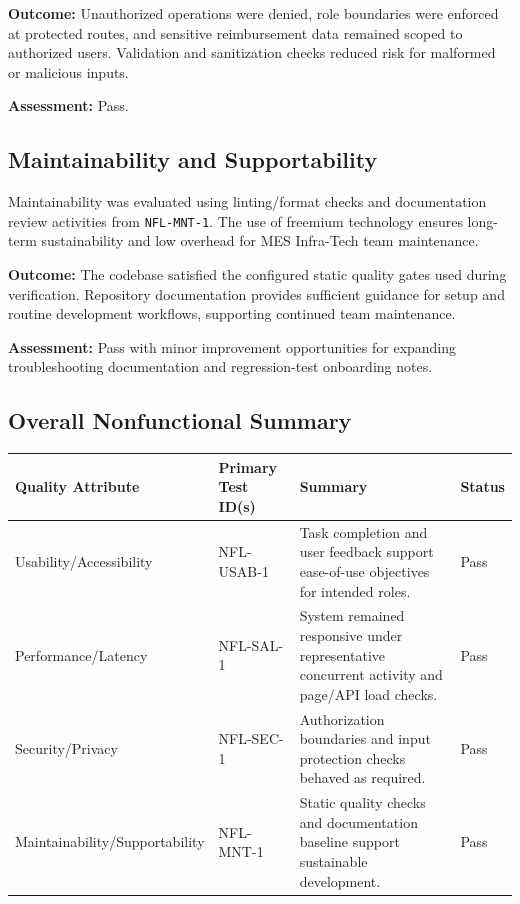 \documentclass[12pt, titlepage]{article}
\begin{document}
\textbf{Outcome:}
Unauthorized operations were denied, role boundaries were enforced at protected
routes, and sensitive reimbursement data remained scoped to authorized users.
Validation and sanitization checks reduced risk for malformed or malicious
inputs.

\textbf{Assessment:} Pass.

\subsection{Maintainability and Supportability}

Maintainability was evaluated using linting/format checks and documentation
review activities from \texttt{NFL-MNT-1}. The use of freemium technology ensures
long-term sustainability and low overhead for MES Infra-Tech team maintenance.

\textbf{Outcome:}
The codebase satisfied the configured static quality gates used during
verification. Repository documentation provides sufficient guidance for setup and
routine development workflows, supporting continued team maintenance.

\textbf{Assessment:} Pass with minor improvement opportunities for expanding
troubleshooting documentation and regression-test onboarding notes.

\subsection{Overall Nonfunctional Summary}

\begin{tabularx}{\textwidth}{>{\raggedright\arraybackslash}p{2.8cm} >{\raggedright\arraybackslash}p{2.4cm} X >{\raggedright\arraybackslash}p{1.6cm}}
\toprule
\textbf{Quality Attribute} & \textbf{Primary Test ID(s)} & \textbf{Summary} & \textbf{Status}\\
\midrule
Usability/Accessibility & NFL-USAB-1 & Task completion and user feedback support ease-of-use objectives for intended roles. & Pass\\
Performance/Latency & NFL-SAL-1 & System remained responsive under representative concurrent activity and page/API load checks. & Pass\\
Security/Privacy & NFL-SEC-1 & Authorization boundaries and input protection checks behaved as required. & Pass\\
Maintainability/Supportability & NFL-MNT-1 & Static quality checks and documentation baseline support sustainable development. & Pass\\
\bottomrule
\end{tabularx}
	
\end{document}
